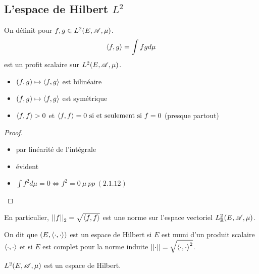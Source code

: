 \subsection{L'espace de Hilbert $L^2$}

\begin{definition}
	On définit pour $f,g \in L^2(E,\mathscr{A}, \mu)$.
	$$\left\langle f, g \right\rangle = \int fg d \mu$$
	est un profit scalaire sur $L^2(E, \mathscr{A}, \mu)$.
	\begin{itemize}
		\item $(f,g) \mapsto \left\langle f, g \right\rangle$ est bilinéaire
		\item $(f,g) \mapsto \left\langle f, g \right\rangle$ est symétrique
		\item $\left\langle f, f \right\rangle > 0$ et $\left\langle f, f \right\rangle = 0 \text{ si et seulement si } f = 0$ (presque partout)
	\end{itemize}
\end{definition}


\begin{proof}
	\begin{itemize}
		\item par linéarité de l'intégrale
		\item évident
		\item $ \int f^2 d \mu = 0 \iff f^2 = 0 \ \mu \ pp \ (2.1.12)$
	\end{itemize}
\end{proof}


\begin{remarque}
	En particulier, $\left|\left|f\right|\right|_2 = \sqrt{\left\langle f, f \right\rangle}$ est une norme sur l'espace vectoriel $L^2_{\mathbb{R}}(E, \mathscr{A}, \mu)$.
\end{remarque}

\begin{definition}
	On dit que $(E, \left\langle \cdot, \cdot \right\rangle)$  est un espace de Hilbert si $E$ est muni d'un produit scalaire $\left\langle \cdot, \cdot \right\rangle$ et
	si $E$ est complet pour la norme induite $\left|\left|\cdot\right|\right| = \sqrt{\left\langle \cdot, \cdot \right\rangle^2}$.
\end{definition}

\begin{theorem}[Riesz]
	$L^2(E, \mathscr{A}, \mu)$ est un espace de Hilbert.
\end{theorem}

